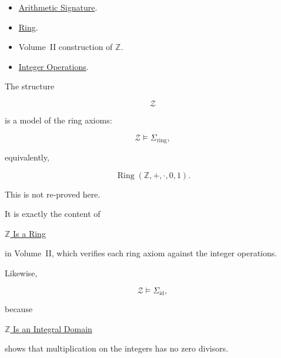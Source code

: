 
\begin{remark*}[Dependencies]

\begin{itemize}
    \item \hyperref[def:arithmetic-signature]{Arithmetic Signature}.
    \item \hyperref[def:ring]{Ring}.
    \item Volume~II construction of $\mathbb Z$.
    \item \hyperref[def:integer-operations]{Integer Operations}.
\end{itemize}

\end{remark*}


\begin{remark*}[Satisfaction]

The structure

\[
\mathcal Z
\]

is a model of the ring axioms:

\[
\mathcal Z
\models
\Sigma_{\mathrm{ring}},
\]

equivalently,

\[
\operatorname{Ring}
(\mathbb Z,+,\cdot,0,1).
\]

This is not re-proved here.

It is exactly the content of

\hyperref[thm:z-is-ring]{$\mathbb Z$ Is a Ring}

in Volume~II, which verifies each ring axiom against the integer operations.

Likewise,

\[
\mathcal Z
\models
\Sigma_{\mathrm{id}},
\]

because

\hyperref[thm:z-is-integral-domain]{$\mathbb Z$ Is an Integral Domain}

shows that multiplication on the integers has no zero divisors.

\end{remark*}



